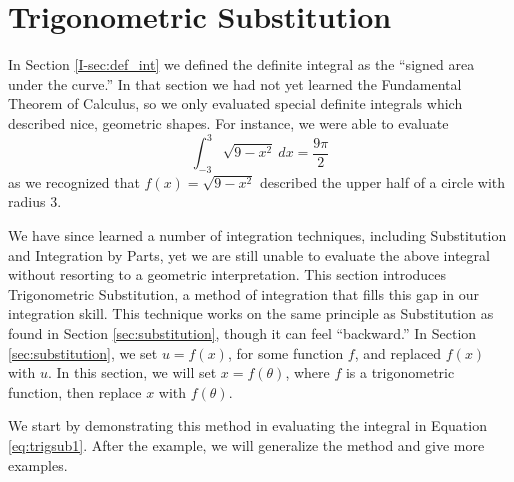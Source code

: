 \section{Trigonometric Substitution}\label{sec:trig_sub}

In Section \ref{I-sec:def_int} we defined the definite integral as the ``signed area under the curve.'' In that section we had not yet learned the Fundamental Theorem of Calculus, so we only evaluated special definite integrals which described nice, geometric shapes. For instance, we were able to evaluate
\begin{equation}
\int_{-3}^3\sqrt{9-x^2}\ dx = \frac{9\pi}{2}\label{eq:trigsub1}
\end{equation}
 as we recognized that $f(x) = \sqrt{9-x^2}$ described the upper half of a circle with radius 3. 

We have since learned a number of integration techniques, including Substitution and Integration by Parts, yet we are still unable to evaluate the above integral without resorting to a geometric interpretation. This section introduces Trigonometric Substitution, a method of integration that fills this gap in our integration skill. This technique works on the same principle as Substitution as found in Section \ref{sec:substitution}, though it can feel ``backward.'' In Section \ref{sec:substitution}, we set $u=f(x)$, for some function $f$, and replaced $f(x)$ with $u$. In this section, we will set $x=f(\theta)$, where $f$ is a trigonometric function, then replace $x$ with $f(\theta)$. 

We start by demonstrating this method in evaluating the integral in Equation \eqref{eq:trigsub1}. After the example, we will generalize the method and give more examples.\\
\enlargethispage{3\baselineskip}

